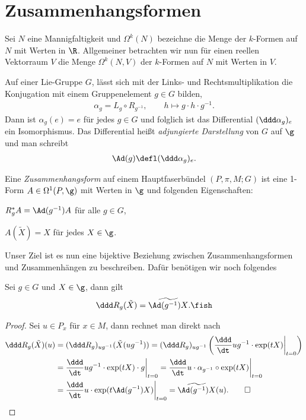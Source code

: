 \documentclass[%
	paper=a5,%
	fleqn,%
	DIV=18,%
	BCOR=0mm,
	fontsize=11pt,
	titlepage=false,%
	bibliography=totoc,
	DIV=18,%
	twoside=true,
	pdftitle=Riemannsche Geometrie,
	pdfauthor=Uwe Semmelmann,
	numbers=noendperiod]%
	{scrbook}
\begin{document}
\section{Zusammenhangsformen}

Sei $N$ eine Mannigfaltigkeit und $\Omega^k(N)$ bezeichne die Menge der
$k$-Formen auf $N$ mit Werten in $\R$. Allgemeiner betrachten wir nun für einen
reellen Vektorraum $V$ die Menge $\Omega^k(N,V)$ der $k$-Formen auf $N$ mit
Werten in $V$.

Auf einer Lie-Gruppe $G$, lässt sich mit der Links- und Rechtsmultiplikation
die Konjugation mit einem Gruppenelement $g\in G$  bilden,
\begin{align*}
\alpha_g = L_g\circ R_{g^{-1}},\qquad h\mapsto g\cdot h\cdot g^{-1}.
\end{align*}
Dann ist $\alpha_g(e) = e$ für jedes $g\in G$ und folglich ist das
Differential $(\ddd \alpha_g)_e$ ein Isomorphismus. Das Differential heißt
\emph{adjungierte Darstellung} von $G$ auf $\g$ und man schreibt
\begin{align*}
\Ad(g) \defl (\ddd\alpha_g)_e.
\end{align*}

\begin{defn}
\label{defn:Zusammenhangsform}
Eine \emph{Zusammenhangsform} auf einem Hauptfaserbündel $(P,\pi,M;G)$ ist eine
1-Form $A\in\Omega^1(P,\g)$ mit Werten in $\g$ und folgenden Eigenschaften:
\begin{defnenum}
\item $R_g^*A = \Ad(g^{-1})A$ für alle $g\in G$,
\item $A(\tilde{X}) = X$ für jedes $X\in \g$.
\end{defnenum}
\end{defn}

Unser Ziel ist es nun eine bijektive Beziehung zwischen Zusammenhangsformen und
Zusammenhängen zu beschreiben. Dafür benötigen wir noch folgendes

\begin{lem}
\label{lem:Rechts-Translation-Fundamentales-Vektorfeld}
Sei $g\in G$ und $X\in \g$, dann gilt
\begin{align*}
\ddd R_g(\tilde{X}) = \widetilde{\Ad(g^{-1})X}.\fish
\end{align*}
\end{lem}
\begin{proof}
Sei $u\in P_x$ für $x\in M$, dann rechnet man direkt nach
\begin{align*}
\ddd R_g(\tilde{X})(u) &= 
(\ddd R_{g})_{ug^{-1}}(\tilde{X}(ug^{-1})) = 
(\ddd R_{g})_{ug^{-1}}\left(\frac{\ddd}{\dt}
ug^{-1}\cdot\exp(tX)\bigg|_{t=0} \right)\\
&= \frac{\ddd}{\dt}
ug^{-1}\cdot\exp(tX)\cdot g\bigg|_{t=0}
= \frac{\ddd}{\dt} u\cdot \alpha_{g^{-1}}\circ\exp(tX)\bigg|_{t=0}\\
&= \frac{\ddd}{\dt} u\cdot \exp(t\Ad(g^{-1})X) \bigg|_{t=0}
= \widetilde{\Ad(g^{-1})X}(u).\qed
\end{align*}
\end{proof}
\end{document}
